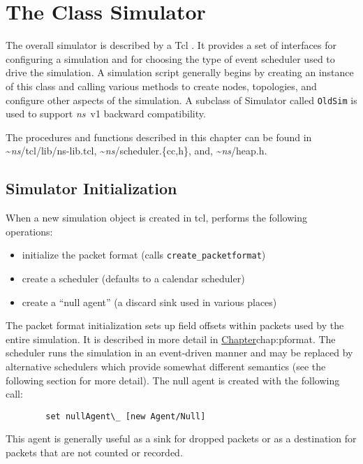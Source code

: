 \chapter{The Class Simulator}
\label{chap:sim}

The overall simulator is described by a Tcl
.
It provides a set of interfaces for configuring a simulation
and for choosing the type of event scheduler used to drive
the simulation.
A simulation script generally begins by creating an instance
of this class and calling various methods to create nodes, topologies,
and configure other aspects of the simulation.
A subclass of Simulator called {\tt OldSim} is used to support
\emph{ns}~v1 backward compatibility.

The procedures and functions described in this chapter can be found in
\textasciitilde\emph{ns}/{tcl/lib/ns-lib.tcl}, \textasciitilde\emph{ns}/{scheduler.\{cc,h\}}, and, \textasciitilde\emph{ns}/{heap.h}.

\section{Simulator Initialization}
\label{sec:siminit}

When a new simulation object is created in tcl,
performs the following operations:
\begin{itemize}
        \item initialize the packet format (calls {\tt create\_packetformat})
        \item create a scheduler (defaults to a calendar scheduler)
        \item create a ``null agent'' (a discard sink used in various places)
\end{itemize}
The packet format initialization sets up field offsets within packets
used by the entire simulation.  It is described in more detail
in \href{the following chapter on packets}{Chapter}{chap:pformat}.
The scheduler runs the simulation in an event-driven manner and may
be replaced by alternative schedulers which provide somewhat
different semantics (see the following section for more detail).
The null agent is created with the following call:
\begin{verbatim}
        set nullAgent\_ [new Agent/Null]
\end{verbatim}
This agent is generally useful as a sink for dropped packets or
as a destination for packets that are not counted or recorded.

